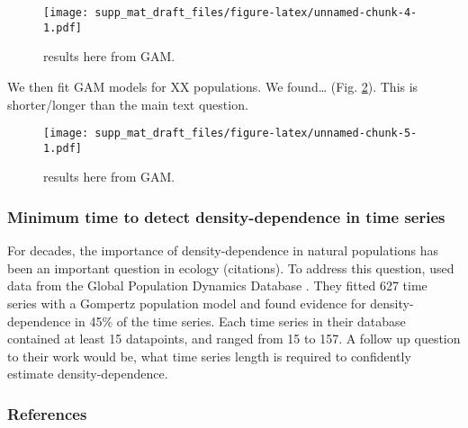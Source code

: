 \documentclass[12pt,]{article}
\begin{document}
\begin{figure}[htbp]
\centering
\texttt{[image: supp\_mat\_draft\_files/figure-latex/unnamed-chunk-4-1.pdf]}
\caption{results here from GAM.\label{fig:gam_example}}
\end{figure}

We then fit GAM models for XX populations. We found\ldots{} (Fig.
\ref{fig:gam_result}). This is shorter/longer than the main text
question.

\begin{figure}[htbp]
\centering
\texttt{[image: supp\_mat\_draft\_files/figure-latex/unnamed-chunk-5-1.pdf]}
\caption{results here from GAM.\label{fig:gam_result}}
\end{figure}

\subsubsection{Minimum time to detect density-dependence in time
series}\label{minimum-time-to-detect-density-dependence-in-time-series}

For decades, the importance of density-dependence in natural populations
has been an important question in ecology (citations). To address this
question, \citet{Knape2012} used data from the Global Population
Dynamics Database \citep{GPDD2010}. They fitted 627 time series with a
Gompertz population model and found evidence for density-dependence in
45\% of the time series. Each time series in their database contained at
least 15 datapoints, and ranged from 15 to 157. A follow up question to
their work would be, what time series length is required to confidently
estimate density-dependence.

\subsubsection{References}\label{references}


\end{document}
